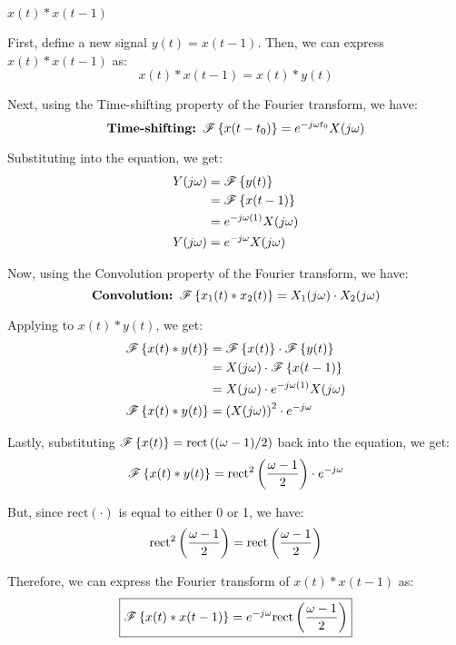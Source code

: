 \documentclass[a4paper, 10pt]{article}
\begin{document}
\newpage

\begin{tosubmit}
\begin{subproblems}[start=5]
    \item \( x(t) * x(t-1) \)
\end{subproblems}

\par\noindent\submitsolution
First, define a new signal \( y(t) = x(t - 1) \). Then, we can express \( x(t) * x(t - 1) \) as:
\[
    x(t) * x(t - 1) = x(t) * y(t)
\]

Next, using the Time-shifting property of the Fourier transform, we have:
\[
    \textbf{Time-shifting: } \mathscr{F} \left\{ x(t - t_0) \right\} = e^{-j\omega t_0} X(j\omega)
\]

Substituting into the equation, we get:
\begin{align*}  
    Y(j\omega) &= \mathscr{F} \left\{ y(t) \right\} \\
    &= \mathscr{F} \left\{ x(t - 1) \right\} \\
    &= e^{-j\omega (1)} X(j\omega) \\
    Y(j\omega) &= e^{-j\omega} X(j\omega)
\end{align*}

Now, using the Convolution property of the Fourier transform, we have:
\[
    \textbf{Convolution: } \mathscr{F} \left\{ x_1(t) * x_2(t) \right\} = X_1(j\omega) \cdot X_2(j\omega)
\]

Applying to \( x(t) * y(t) \), we get:
\begin{align*}  
    \mathscr{F} \left\{ x(t) * y(t) \right\} &= \mathscr{F} \left\{ x(t) \right\} \cdot \mathscr{F} \left\{ y(t) \right\} \\
    &= X(j\omega) \cdot \mathscr{F} \left\{ x(t - 1) \right\} \\
    &= X(j\omega) \cdot e^{-j\omega (1)} X(j\omega) \\
    \mathscr{F} \left\{ x(t) * y(t) \right\} &= \left( X(j\omega) \right)^2 \cdot e^{-j\omega}
\end{align*}

Lastly, substituting \( \mathscr{F} \left\{ x(t) \right\} = \textrm{rect} \left( (\omega-1)/2 \right) \) back into the equation, we get:
\[
    \mathscr{F} \left\{ x(t) * y(t) \right\} = \textrm{rect}^2 \left( \frac{\omega - 1}{2} \right) \cdot e^{-j\omega}
\]

But, since \( \textrm{rect}(\cdot) \) is equal to either 0 or 1, we have:
\[
    \textrm{rect}^2 \left( \frac{\omega - 1}{2} \right) = \textrm{rect} \left( \frac{\omega - 1}{2} \right)
\]

Therefore, we can express the Fourier transform of \( x(t) * x(t - 1) \) as:
\[ \boxed{
    \mathscr{F} \left\{ x(t) * x(t - 1) \right\} = e^{-j\omega} \textrm{rect} \left( \frac{\omega - 1}{2} \right)
} \]
\end{tosubmit}
\end{document}

